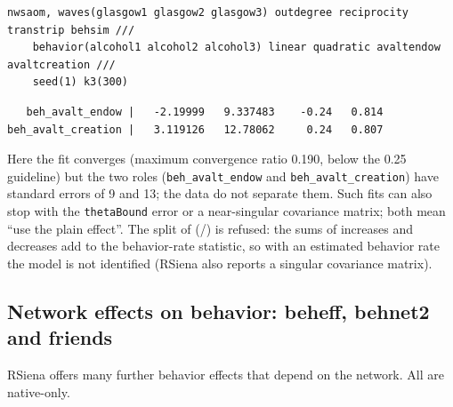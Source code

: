 \begin{lstlisting}
nwsaom, waves(glasgow1 glasgow2 glasgow3) outdegree reciprocity transtrip behsim ///
    behavior(alcohol1 alcohol2 alcohol3) linear quadratic avaltendow avaltcreation ///
    seed(1) k3(300)
\end{lstlisting}
\begin{lstlisting}
   beh_avalt_endow |   -2.19999   9.337483    -0.24   0.814
beh_avalt_creation |   3.119126   12.78062     0.24   0.807
\end{lstlisting}
Here the fit converges (maximum convergence ratio 0.190, below the 0.25 guideline) but the two roles (\texttt{beh\_avalt\_endow} and \texttt{beh\_avalt\_creation}) have standard errors of 9 and 13; the data do not separate them. Such fits can also stop with the \texttt{thetaBound} error or a near-singular covariance matrix; both mean ``use the plain effect''. The split of  (/) is refused: the sums of increases and decreases add to the behavior-rate statistic, so with an estimated behavior rate the model is not identified (RSiena also reports a singular covariance matrix).

\subsection{Network effects on behavior: beheff, behnet2 and friends}

RSiena offers many further behavior effects that depend on the network. All are native-only.

